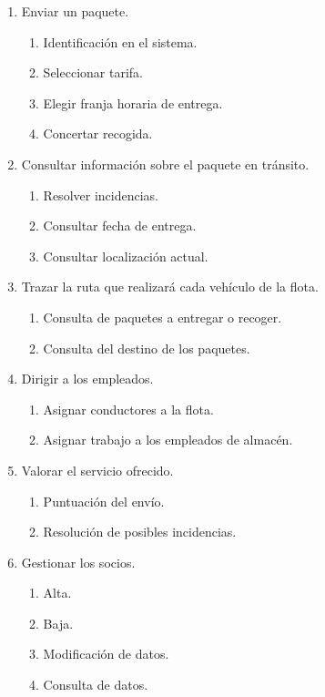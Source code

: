 \documentclass[12pt,spanish]{article}
\begin{document}
\begin{enumerate}[label=\textbf{CU-\arabic*}]
	\item Enviar un paquete.
	\begin{enumerate}[label=\textbf{CU-1.\arabic*}]	
		\item Identificación en el sistema.
		\item Seleccionar tarifa.
		\item Elegir franja horaria de entrega.
		\item Concertar recogida.
	\end{enumerate}
	\item Consultar información sobre el paquete en tránsito.
	\begin{enumerate}[label=\textbf{CU-2.\arabic*}]
		\item Resolver incidencias.
		\item Consultar fecha de entrega.
		\item Consultar localización actual.
	\end{enumerate}
	\item Trazar la ruta que realizará cada vehículo de la flota.
	\begin{enumerate}[label=\textbf{CU-3.\arabic*}]
		\item Consulta de paquetes a entregar o recoger.
		\item Consulta del destino de los paquetes.	
	\end{enumerate}
	\item Dirigir a los empleados.
	\begin{enumerate}[label=\textbf{CU-4.\arabic*}]
		\item Asignar conductores a la flota.
		\item Asignar trabajo a los empleados de almacén.	
	\end{enumerate}
	\item Valorar el servicio ofrecido.
	\begin{enumerate}[label=\textbf{CU-5.\arabic*}]
		\item Puntuación del envío.
		\item Resolución de posibles incidencias.
	\end{enumerate}
	\item Gestionar los socios.
	\begin{enumerate}[label=\textbf{CU-6.\arabic*}]
		\item Alta.
		\item Baja.
		\item Modificación de datos.
		\item Consulta de datos.
	\end{enumerate}

\end{enumerate}
\end{document}
